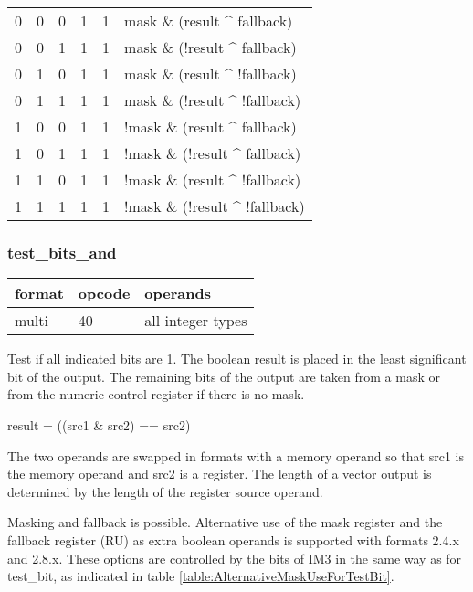 \documentclass[forwardcom.tex]{subfiles}
\begin{document}
\begin{longtable} {|p{10mm}|p{10mm}|p{10mm}|p{10mm}|p{10mm}|p{60mm}|}
\hline
0 & 0 & 0 & 1 & 1 & mask \& (result \^{} fallback) \\
0 & 0 & 1 & 1 & 1 & mask \& (!result \^{} fallback) \\
0 & 1 & 0 & 1 & 1 & mask \& (result \^{} !fallback) \\
0 & 1 & 1 & 1 & 1 & mask \& (!result \^{} !fallback) \\
1 & 0 & 0 & 1 & 1 & !mask \& (result \^{} fallback) \\
1 & 0 & 1 & 1 & 1 & !mask \& (!result \^{} fallback) \\
1 & 1 & 0 & 1 & 1 & !mask \& (result \^{} !fallback) \\
1 & 1 & 1 & 1 & 1 & !mask \& (!result \^{} !fallback) \\
\hline
\end{longtable}
\vspace{2mm}

\subsubsection{test\_bits\_and}
\label{table:testBitsAndInstruction}
\begin{tabular}{|p{12mm}|p{12mm}|p{110mm}|}
\hline
\bfseries format & \bfseries opcode & \bfseries operands \\ \hline
multi & 40 & all integer types \\ \hline
\end{tabular}
\vspace{2mm}

Test if all indicated bits are 1.
The boolean result is placed in the least significant bit of the output. The remaining bits of the output are taken from a mask or from the numeric control register if there is no mask.
\vspace{2mm}

result = ((src1 \& src2) == src2)

\vspace{2mm}
The two operands are swapped in formats with a memory operand so that src1 is the memory operand and src2 is a register. The length of a vector output is determined by the length of the register source operand.

\vspace{2mm}
Masking and fallback is possible. Alternative use of the mask register and the fallback register (RU) as extra boolean operands is supported with formats 2.4.x and 2.8.x. These options are controlled by the bits of IM3 in the same way as for test\_bit, as indicated in table \ref{table:AlternativeMaskUseForTestBit}.
\end{document}
